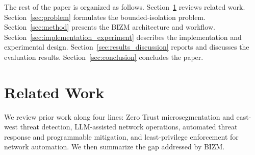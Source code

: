 \documentclass[final,5p]{elsarticle}
\begin{document}
The rest of the paper is organized as follows. Section~\ref{sec:related} reviews related work. Section~\ref{sec:problem} formulates the bounded-isolation problem. Section~\ref{sec:method} presents the BIZM architecture and workflow. Section~\ref{sec:implementation_experiment} describes the implementation and experimental design. Section~\ref{sec:results_discussion} reports and discusses the evaluation results. Section~\ref{sec:conclusion} concludes the paper.

\section{Related Work}
\label{sec:related}

We review prior work along four lines: Zero Trust microsegmentation and east-west threat detection, LLM-assisted network operations, automated threat response and programmable mitigation, and least-privilege enforcement for network automation. We then summarize the gap addressed by BIZM.
\end{document}
